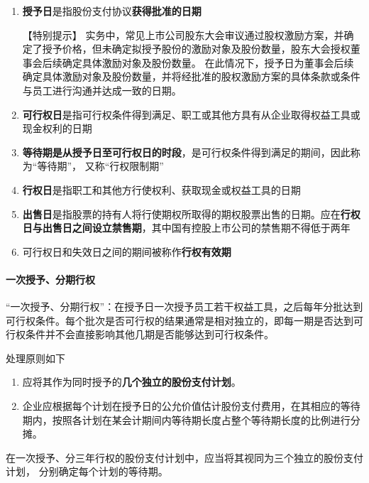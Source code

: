\documentclass[UTF8,12pt]{ctexart}
\numberwithin{equation}{section} %
\numberwithin{figure}{section}
\numberwithin{table}{section}
\begin{document}
	\begin{enumerate}
		\item \textbf{授予日}是指股份支付协议\textbf{获得批准的日期}
		
		【特别提示】
		实务中，常见上市公司股东大会审议通过股权激励方案，并确定了授予价格，但未确定拟授予股份的激励对象及股份数量，股东大会授权董事会后续确定具体激励对象及股份数量。
		在此情况下，授予日为董事会后续确定具体激励对象及股份数量，并将经批准的股权激励方案的具体条款或条件与员工进行沟通并达成一致的日期。
		
		\item \textbf{可行权日}是指可行权条件得到满足、职工或其他方具有从企业取得权益工具或现金权利的日期
		
		\item \textbf{等待期是从授予日至可行权日的时段}，是可行权条件得到满足的期间，因此称为“等待期”， 又称“行权限制期”
		
		\item \textbf{行权日}是指职工和其他方行使权利、获取现金或权益工具的日期
		
		\item \textbf{出售日}是指股票的持有人将行使期权所取得的期权股票出售的日期。应在\textbf{行权日与出售日之间设立禁售期}，其中国有控股上市公司的禁售期不得低于两年
		
		\item 可行权日和失效日之间的期间被称作\textbf{行权有效期}
	\end{enumerate}

	\paragraph{一次授予、分期行权}“一次授予、分期行权”：在授予日一次授予员工若干权益工具，之后每年分批达到可行权条件。每个批次是否可行权的结果通常是相对独立的，即每一期是否达到可行权条件并不会直接影响其他几期是否能够达到可行权条件。
	
	处理原则如下
	\begin{enumerate}
		\item 应将其作为同时授予的\textbf{几个独立的股份支付计划}。
		
		\item 企业应根据每个计划在授予日的公允价值估计股份支付费用，在其相应的等待期内，按照各计划在某会计期间内等待期长度占整个等待期长度的比例进行分摊。
	\end{enumerate}

	
	在一次授予、分三年行权的股份支付计划中，应当将其视同为三个独立的股份支付计划， 分别确定每个计划的等待期。
	
\end{document}
